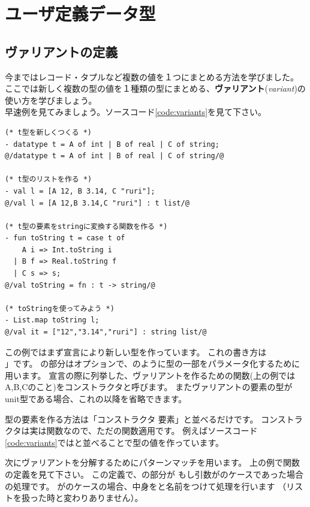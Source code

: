 \documentclass[11pt,a4paper]{article}
\begin{document}
\section{ユーザ定義データ型}
\subsection{ヴァリアントの定義}

今まではレコード・タプルなど複数の値を１つにまとめる方法を学びました。
ここでは新しく複数の型の値を１種類の型にまとめる、\textbf{ヴァリアント}(\textit{variant})の使い方を学びましょう。\\
早速例を見てみましょう。ソースコード\ref{code:variants}を見て下さい。

\begin{lstlisting}[caption=単純なヴァリアント,label=code:variants]
(* t型を新しくつくる *)
- datatype t = A of int | B of real | C of string;
@/datatype t = A of int | B of real | C of string/@

(* t型のリストを作る *)
- val l = [A 12, B 3.14, C "ruri"];
@/val l = [A 12,B 3.14,C "ruri"] : t list/@

(* t型の要素をstringに変換する関数を作る *)
- fun toString t = case t of
    A i => Int.toString i
  | B f => Real.toString f
  | C s => s;
@/val toString = fn : t -> string/@

(* toStringを使ってみよう *)
- List.map toString l;
@/val it = ["12","3.14","ruri"] : string list/@
\end{lstlisting}

この例ではまず宣言により新しい型を作っています。
これの書き方は\\」です。
の部分はオプションで、のように型の一部をパラメータ化するために用います。
宣言の際に列挙した、ヴァリアントを作るための関数(上の例ではA,B,Cのこと)をコンストラクタと呼びます。
またヴァリアントの要素の型がunit型である場合、これの以降を省略できます。

型の要素を作る方法は「コンストラクタ 要素」と並べるだけです。
コンストラクタは実は関数なので、ただの関数適用です。
例えばソースコード\ref{code:variants}ではと並べることで型の値を作っています。

次にヴァリアントを分解するためにパターンマッチを用います。
上の例で関数の定義を見て下さい。
この定義で、の部分が
もし引数がのケースであった場合の処理です。
がのケースの場合、中身をと名前をつけて処理を行います
（リストを扱った時と変わりありません）。
\end{document}
